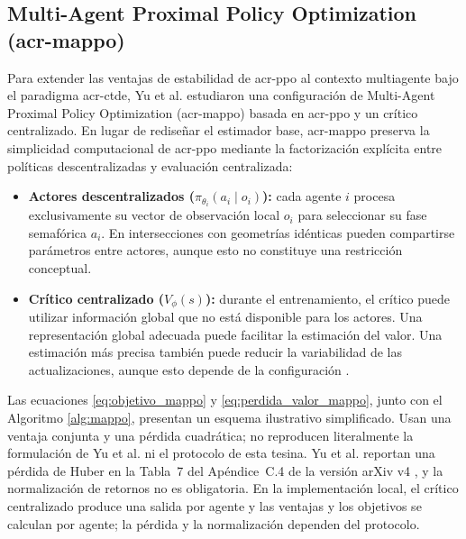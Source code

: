 \subsection[MAPPO]{Multi-Agent Proximal Policy Optimization (\acrshort{acr-mappo})}\label{subsec:mappo}

Para extender las ventajas de estabilidad de \acrshort{acr-ppo} al contexto multiagente bajo el paradigma \acrshort{acr-ctde}, Yu et al. \cite{yu2022surprising} estudiaron una configuración de Multi-Agent Proximal Policy Optimization (\acrshort{acr-mappo}) basada en \acrshort{acr-ppo} y un crítico centralizado. En lugar de rediseñar el estimador base, \acrshort{acr-mappo} preserva la simplicidad computacional de \acrshort{acr-ppo} mediante la factorización explícita entre políticas descentralizadas y evaluación centralizada:
\begin{itemize}
    \item \textbf{Actores descentralizados ($\pi_{\theta_i}(a_i \mid o_i)$):} cada agente $i$ procesa exclusivamente su vector de observación local $o_i$ para seleccionar su fase semafórica $a_i$. En intersecciones con geometrías idénticas pueden compartirse parámetros entre actores, aunque esto no constituye una restricción conceptual.
    \item \textbf{Crítico centralizado ($V_\phi(s)$):} durante el entrenamiento, el crítico puede utilizar información global que no está disponible para los actores. Una representación global adecuada puede facilitar la estimación del valor. Una estimación más precisa también puede reducir la variabilidad de las actualizaciones, aunque esto depende de la configuración \cite{yu2022surprising}.
\end{itemize}

Las ecuaciones \eqref{eq:objetivo_mappo} y \eqref{eq:perdida_valor_mappo}, junto con el Algoritmo \ref{alg:mappo}, presentan un esquema ilustrativo simplificado. Usan una ventaja conjunta y una pérdida cuadrática; no reproducen literalmente la formulación de Yu et al. ni el protocolo de esta tesina. Yu et al. reportan una pérdida de Huber en la Tabla~7 del Apéndice~C.4 de la versión arXiv v4 \cite{yu2022surprising}, y la normalización de retornos no es obligatoria. En la implementación local, el crítico centralizado produce una salida por agente y las ventajas y los objetivos se calculan por agente; la pérdida y la normalización dependen del protocolo.

